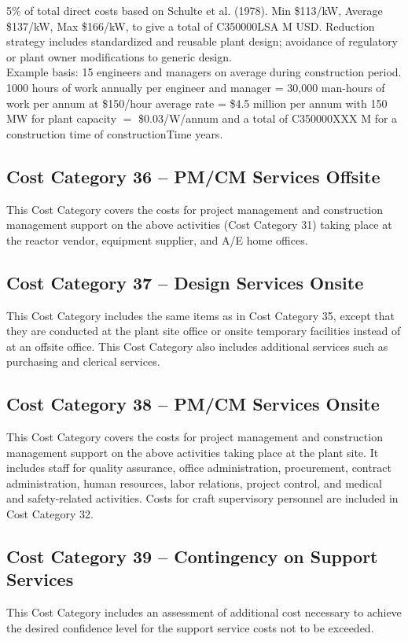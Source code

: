 5\% of total direct costs based on Schulte et al. (1978). Min \$113/kW, Average \$137/kW, Max 
\$166/kW, to give a total of C350000LSA M USD.  Reduction strategy includes standardized and reusable plant design; avoidance of regulatory or 
plant owner modifications to generic design.\\


Example basis: 15 engineers and managers on average during construction period. 
1000 hours of work annually per engineer and manager = 30,000 man-hours of work per 
annum at \$150/hour average rate = \$4.5 million per annum with 150 MW for plant capacity $=$ \$0.03/W/annum and a total of C350000XXX M for a construction time of constructionTime years.


\subsection*{Cost Category 36 – PM/CM Services Offsite}
This Cost Category covers the costs for project management and construction management support on the above activities (Cost Category 31) taking place at the reactor vendor, equipment supplier, and A/E home offices.

\subsection*{Cost Category 37 – Design Services Onsite}
This Cost Category includes the same items as in Cost Category 35, except that they are conducted at the plant site office or onsite temporary facilities instead of at an offsite office. This Cost Category also includes additional services such as purchasing and clerical services.

\subsection*{Cost Category 38 – PM/CM Services Onsite}
This Cost Category covers the costs for project management and construction management support on the above activities taking place at the plant site. It includes staff for quality assurance, office administration, procurement, contract administration, human resources, labor relations, project control, and medical and safety-related activities. Costs for craft supervisory personnel are included in Cost Category 32.

\subsection*{Cost Category 39 – Contingency on Support Services}
This Cost Category includes an assessment of additional cost necessary to achieve the desired confidence level for the support service costs not to be exceeded.

